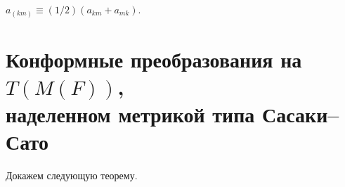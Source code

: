 $a_{(km)} \equiv (1/2)(a_{km} + a_{mk})$.











\section{Конформные преобразования на $T(M(F))$,\protect\\


наделенном метрикой типа Сасаки--Сато}





Докажем следующую теорему.





